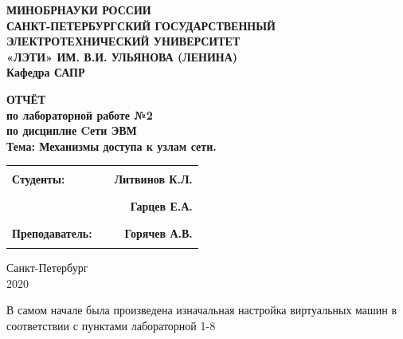 \documentclass[a4paper,12pt]{article}
\begin{document}
\thispagestyle{empty} %

\begin{centering}
\textbf{
{\large МИНОБРНАУКИ РОССИИ\\
САНКТ-ПЕТЕРБУРГСКИЙ ГОСУДАРСТВЕННЫЙ\\
ЭЛЕКТРОТЕХНИЧЕСКИЙ УНИВЕРСИТЕТ\\
«ЛЭТИ» ИМ. В.И. УЛЬЯНОВА (ЛЕНИНА)\\
Кафедра САПР}\\
}
\end{centering}


\vspace{7cm}

\begin{centering}
\textbf{{\large 
ОТЧЁТ\\
по лабораторной работе №2\\
по дисциплне \guillemotleft Cети ЭВМ\guillemotright\\
Тема: \guillemotleft Механизмы доступа к узлам сети.\guillemotright\\
}}
\end{centering}

\vspace{4cm}

\begin{tabular}{l c r}
    \textbf{{\large Студенты:}}& \rule{4cm}{1pt} & \textbf{{\large Литвинов К.Л.}}\\
    \textbf{}& \rule{4cm}{1pt} &\textbf{{\large Гарцев Е.А.}}\\
    \textbf{{\large Преподаватель:}}& \hspace{2cm} \rule{4cm}{1pt} \hspace{2cm} & \textbf{{\large Горячев А.В.}}\\
\end{tabular}

\vspace{6cm}


\begin{centering}
	{\large
Санкт-Петербург \\
2020 \\
}
\end{centering}
\newpage
В самом начале была произведена изначальная настройка виртуальных машин в соответствии с
пунктами лабораторной 1-8\\
\end{document}
